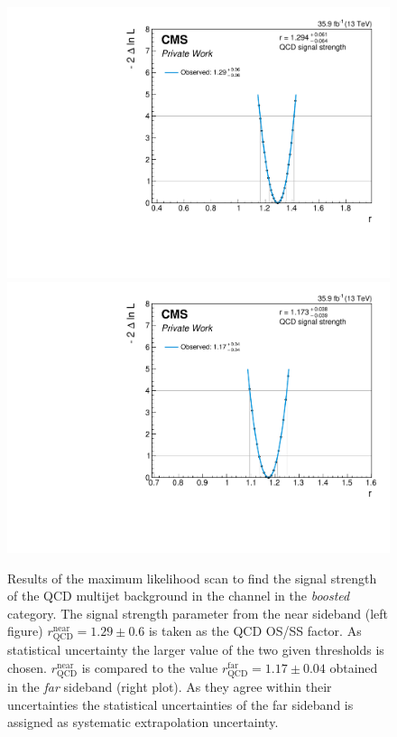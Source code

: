 \begin{figure}[h!]
    \centering
    \includegraphics[width=.49\textwidth]{Figures/background_estimation/RQCDOSSS/Scans/mt_dijet2D_antiiso_near/plots/nll.pdf}
    \includegraphics[width=.49\textwidth]{Figures/background_estimation/RQCDOSSS/Scans/mt_dijet2D_antiiso_far/plots/nll.pdf}
    \caption[Results of the maximum likelihood scan for $R_\text{QCD}^\text{OS/SS}$ in the \mutau{} channel for the \textit{dijet} category.]{Results of the maximum likelihood scan to find the signal strength of the QCD multijet background in the \mutau{} channel in the \textit{boosted} category.
    The signal strength parameter from the near sideband (left figure) $r^{\text{near}}_\text{QCD} = 1.29\pm  0.6$ is taken as the QCD OS/SS factor. As statistical uncertainty the larger value of the two given thresholds is chosen. 
    $r^{\text{near}}_\text{QCD}$ is compared to the value $r^{\text{far}}_\text{QCD} = 1.17\pm 0.04$ obtained in the \textit{far} sideband (right plot). As they agree within their uncertainties the statistical uncertainties of the far sideband is assigned as systematic extrapolation uncertainty.}\label{SUPPLE:BK:Scans:mt_2jet}
\end{figure}

